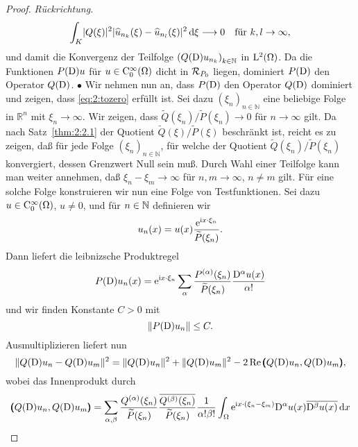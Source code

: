 \begin{proof} {\it Rückrichtung.}
\begin{equation}
\int_K\lvert Q(\xi)\rvert^2\lvert\widehat{u}_{n_k}(\xi)-\widehat{u}_{n_l}(\xi)\rvert^2\,\mathrm d \xi\longrightarrow0
\quad\text{für}~ k,l \rightarrow \infty,
\end{equation}
und damit die Konvergenz der Teilfolge $\left(Q(\mathrm D)u_{n_k} \right)_{k \in \mathbb{N}}$ in $\mathrm L^2(\Omega)$. 
Da die Funktionen $P(\mathrm D)u$ für $u\in \mathrm C^\infty_0(\Omega)$ dicht in $\mathcal R_{P_0}$ liegen, dominiert $P(\mathrm D)$ den Operator $Q(\mathrm D)$.
$\bullet$
Wir nehmen nun an, dass $P(\mathrm D)$ den Operator $Q(\mathrm D)$ dominiert und zeigen, dass \eqref{eq:2:tozero} erfüllt ist.
 Sei dazu $(\xi_n)_{n \in \mathbb{N}}$ eine beliebige Folge in $\mathbb{R}^n$ mit $\xi_n \rightarrow \infty$. Wir zeigen, dass $\widetilde{Q}(\xi_{n})/\widetilde{P}(\xi_{n})\to0$ für $n \rightarrow \infty$ gilt. Da nach Satz~\ref{thm:2:2.1} der Quotient $\widetilde Q(\xi)/\widetilde P(\xi)$ beschränkt ist, reicht es zu zeigen, daß für jede Folge $(\xi_n)_{n \in \mathbb{N}}$, für welche der Quotient $\widetilde Q(\xi_n)/\widetilde P(\xi_n)$ konvergiert, dessen Grenzwert Null sein muß. Durch Wahl einer Teilfolge kann man weiter annehmen, daß $\xi_n-\xi_m\to\infty$ für $n,m\to\infty$, $n\ne m$ gilt. Für eine solche Folge konstruieren wir nun eine Folge von Testfunktionen.
Sei dazu  $u\in \mathrm C^\infty_0(\Omega)$, $u\neq0$, und für $n\in\mathbb N$ definieren wir
\begin{equation}
u_n(x)=u(x)\frac{\mathrm e^{\mathrm i x \cdot \xi_n}}{\widetilde{P}(\xi_n)}.
\end{equation}
Dann liefert die leibnizsche Produktregel
\begin{equation}
P(\mathrm D)u_n(x)=\mathrm e^{\mathrm i x \cdot \xi_n}\sum_\alpha\frac{P^{(\alpha)}(\xi_n)}{\widetilde{P}(\xi_n)}\frac{\mathrm D^\alpha u(x)}{\alpha!}
\end{equation}
und wir finden Konstante $C>0$ mit
\begin{equation}\label{eq:2:PDunb}
\lVert P(\mathrm D)u_n\rVert\leq C.
\end{equation}
Ausmultiplizieren liefert nun
\begin{equation}\label{eq:2:kz}
\lVert Q(\mathrm D)u_n-Q(\mathrm D)u_m\rVert^2=\lVert Q(\mathrm D)u_n\rVert^2+\lVert Q(\mathrm D)u_m\rVert^2-2\operatorname{Re}\pmb(Q(\mathrm D)u_n,Q(\mathrm D)u_m\pmb), 
\end{equation}
wobei das Innenprodukt durch
\begin{equation}
\pmb(Q(\mathrm D)u_n,Q(\mathrm D)u_m\pmb)=
\sum_{\alpha,\beta}\frac{Q^{(\alpha)}(\xi_n)}{\widetilde{P}(\xi_n)}\frac{\overline{Q^{(\beta)}(\xi_n)}}{\widetilde{P}(\xi_n)}
\frac1{\alpha!\beta!}\int_\Omega \mathrm e^{\mathrm i x \cdot(\xi_n-\xi_m)} \mathrm D^\alpha u(x) \overline{\mathrm D^\beta u(x) }\,\mathrm d  x
\end{equation}

\end{proof}
